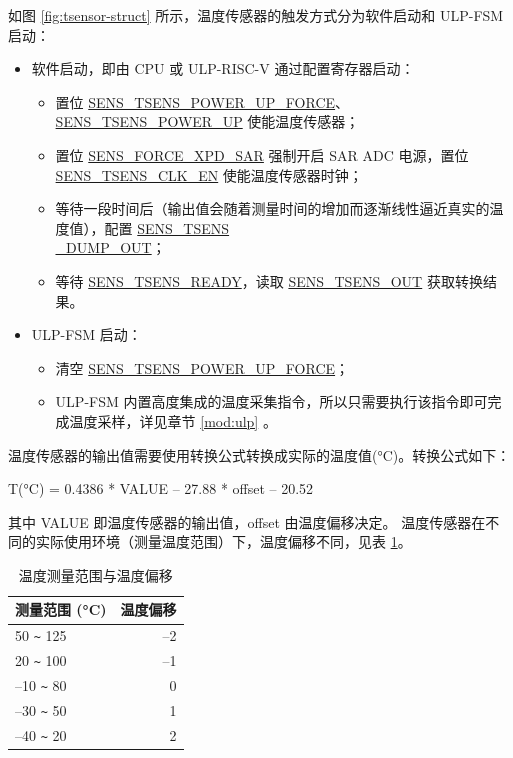 \documentclass[main\_\_CN.tex]{subfiles}
\begin{document}
如图 \ref{fig:tsensor-struct} 所示，温度传感器的触发方式分为软件启动和 ULP-FSM 启动：
\begin{itemize}
   \item 软件启动，即由 CPU 或 ULP-RISC-V 通过配置寄存器启动：
    \begin{itemize}
        \item 置位 \hyperref[fielddesc:SENSTSENSPOWERUPFORCE]{SENS\_TSENS\_POWER\_UP\_FORCE}、\hyperref[fielddesc:SENSTSENSPOWERUP]{SENS\_TSENS\_POWER\_UP} 使能温度传感器；
        \item 置位 \hyperref[fielddesc:SENSFORCEXPDSAR]{SENS\_FORCE\_XPD\_SAR} 强制开启 SAR ADC 电源，置位 \hyperref[fielddesc:SENSTSENSCLKEN]{SENS\_TSENS\_CLK\_EN} 使能温度传感器时钟；
        \item 等待一段时间后（输出值会随着测量时间的增加而逐渐线性逼近真实的温度值），配置 \hyperref[fielddesc:SENSTSENSDUMPOUT]{SENS\_TSENS\\\_DUMP\_OUT}；
        \item 等待 \hyperref[fielddesc:SENSTSENSREADY]{SENS\_TSENS\_READY}，读取 \hyperref[fielddesc:SENSTSENSOUT]{SENS\_TSENS\_OUT} 获取转换结果。
    \end{itemize}
    \item ULP-FSM 启动：
    \begin{itemize}
        \item 清空 \hyperref[fielddesc:SENSTSENSPOWERUPFORCE]{SENS\_TSENS\_POWER\_UP\_FORCE}；
        \item ULP-FSM 内置高度集成的温度采集指令，所以只需要执行该指令即可完成温度采样，详见章节 \ref{mod:ulp} \textit{}。
    \end{itemize}
\end{itemize}

温度传感器的输出值需要使用转换公式转换成实际的温度值(°C)。转换公式如下：

\begin{centering}
        T(°C) = 0.4386 * VALUE – 27.88 * offset – 20.52\\
\end{centering}

其中 VALUE 即温度传感器的输出值，offset 由温度偏移决定。 温度传感器在不同的实际使用环境（测量温度范围）下，温度偏移不同，见表 \ref{tab:tsensor-dac}。

\begin{longtable}[c]{|l|r|}
    \caption{温度测量范围与温度偏移}
    \label{tab:tsensor-dac}
    \\\hline
    \rowcolor{lightgray}
    \textbf{测量范围 (°C)}  & \textbf{温度偏移} \\\hline
    50 \verb+~+ 125 & –2 \\\hline
    20 \verb+~+ 100 &  –1 \\\hline
    –10 \verb+~+ 80 &  0 \\\hline
    –30 \verb+~+ 50 &  1 \\\hline
    –40 \verb+~+ 20 &  2 \\\hline
\end{longtable}
\end{document}
